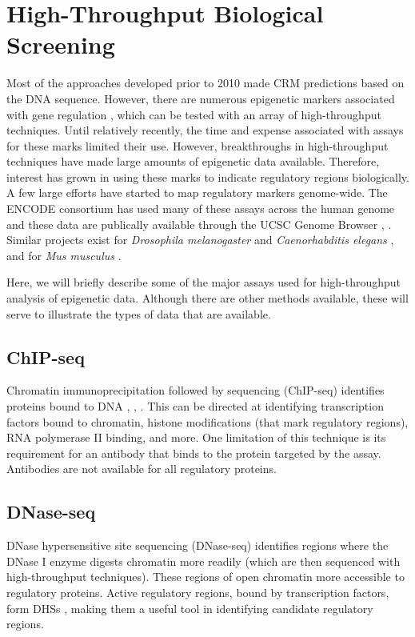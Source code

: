\documentclass{frontiersENG} %
\begin{document}
\section{High-Throughput Biological Screening}
\label{section:hts}

Most of the approaches developed prior to 2010 made CRM predictions
based on the DNA sequence. However, there are numerous epigenetic
markers associated with gene regulation \cite{Bernstein2007}, which
can be tested with an array of high-throughput techniques. Until
relatively recently, the time and expense associated with assays for
these marks limited their use. However, breakthroughs in
high-throughput techniques have made large amounts of epigenetic data
available. Therefore, interest has grown in using these marks to
indicate regulatory regions biologically. A few large efforts have
started to map regulatory markers genome-wide. The ENCODE consortium
has used many of these assays across the human genome
\cite{Dunham2012} and these data are publically available through the
UCSC Genome Browser \cite{Rosenbloom2013}, \cite{Kent2002}. Similar
projects exist for \textit{Drosophila melanogaster} and
\textit{Caenorhabditis elegans} \cite{Celniker2009}, and for
\textit{Mus musculus} \cite{Stamatoyannopoulos2012}.

Here, we will briefly describe some of the major assays used for
high-throughput analysis of epigenetic data. Although there are other
methods available, these will serve to illustrate the types of data
that are available.

\subsection{ChIP-seq}
Chromatin immunoprecipitation followed by sequencing (ChIP-seq)
identifies proteins bound to DNA \cite{Kim2007}, \cite{Barski2007},
\cite{Ren2000}. This can be directed at identifying transcription
factors bound to chromatin, histone modifications (that mark
regulatory regions), RNA polymerase II binding, and more. One
limitation of this technique is its requirement for an antibody that
binds to the protein targeted by the assay. Antibodies are not
available for all regulatory proteins.

\subsection{DNase-seq}
DNase hypersensitive site sequencing (DNase-seq) identifies regions
where the DNase I enzyme digests chromatin more readily
\cite{Crawford2006} (which are then sequenced with high-throughput
techniques). These regions of open chromatin more accessible to
regulatory proteins. Active regulatory regions, bound by transcription
factors, form DHSs \cite{Cockerill2011}, making them a useful tool in
identifying candidate regulatory regions.
\end{document}

